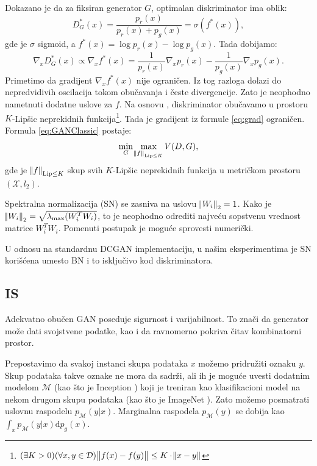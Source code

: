 \documentclass[12pt, a4paper]{article}
\begin{document}
Dokazano je \cite{GAN-2014} da za fiksiran generator $G$, optimalan diskriminator ima oblik:
\begin{equation}
D^{\ast}_{G}(x) = \frac{p_r(x)}{p_r(x) + p_g(x)}=\sigma(f^{\ast}(x)),
\end{equation}
gde je $\sigma$ sigmoid, a $f^{\ast}(x) = \log{p_r(x)} - \log{p_g(x)}$. Tada dobijamo:
\begin{equation}
\nabla_x D^{\ast}_{G}(x) \propto \nabla_x f^{\ast}(x)=\frac{1}{p_r(x)}\nabla_x p_r(x)-\frac{1}{p_g(x)}\nabla_x p_g(x).
\label{eq:grad}
\end{equation}
Primetimo da gradijent $\nabla_x f^{\ast}(x)$ nije ograničen. Iz tog razloga dolazi do nepredvidivih oscilacija tokom obučavanja i česte divergencije. Zato je neophodno nametnuti dodatne uslove za $f$. Na osnovu \cite{Lipschitz-2017}, diskriminator obučavamo u prostoru $K$-Lipšic neprekidnih funkcija\footnote{$(\exists K > 0)(\forall x, y \in \mathcal{D}) \norm{f(x) - f(y)} \leq K \cdot \norm{x-y}$}. Tada je gradijent iz formule \ref{eq:grad} ograničen. Formula \ref{eq:GANClassic} postaje:
\begin{equation}
\min_G \max_{\norm{f}_{\operatorname{Lip} \leq K}} V(D, G),
\end{equation}
gde je $\norm{f}_{\operatorname{Lip} \leq K}$ skup svih $K$-Lipšic neprekidnih funkcija u metričkom prostoru $(\mathcal{X}, l_2)$.

Spektralna normalizacija (SN) \cite{SN-2018} se zasniva na uslovu $\norm{W_i}_2=1$. Kako je $\norm{W_i}_2 = \sqrt{\lambda_{\text{max}}(W^{T}_{i} W_i)}$, to je neophodno odrediti najveću sopstvenu vrednost matrice $W^{T}_{i} W_i$. Pomenuti postupak je moguće sprovesti numerički.

U odnosu na standardnu DCGAN implementaciju, u našim eksperimentima je SN korišćena umesto BN i to isključivo kod diskriminatora.

\subsection{IS}
Adekvatno obučen GAN poseduje sigurnost i varijabilnost. To znači da generator može dati svojstvene podatke, kao i da ravnomerno pokriva čitav kombinatorni prostor.

Prepostavimo da svakoj instanci skupa podataka $x$ možemo pridružiti oznaku $y$. Skup podataka takve oznake ne mora da sadrži, ali ih je moguće uvesti dodatnim modelom $\mathcal{M}$ (kao što je Inception \cite{Inception-2014}) koji je treniran kao klasifikacioni model na nekom drugom skupu podataka (kao što je ImageNet \cite{ImageNet-2014}). Zato možemo posmatrati uslovnu raspodelu $p_{\mathcal{M}}(y|x)$. Marginalna raspodela $p_{\mathcal{M}}(y)$ se dobija kao $\int_{x}p_{\mathcal{M}}(y|x)\text{d}p_g(x)$.
\end{document}
